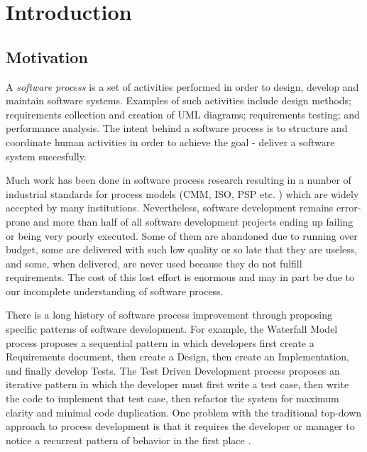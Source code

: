 \chapter{Introduction}
\section{Motivation}
A \textit{software process} is a set of activities performed in order to design, develop and maintain software systems. Examples of such activities include design methods; requirements collection and creation of UML diagrams; requirements testing; and performance analysis. The intent behind a software process is to structure and coordinate human activities in order to achieve the goal - deliver a software system succesfully.

Much work has been done in software process research resulting in a number of industrial standards for process models (CMM, ISO, PSP etc. \cite{citeulike:5043104}) which are widely accepted by many institutions. Nevertheless, software development remains error-prone and more than half of all software development projects ending up failing or being very poorly executed. Some of them are abandoned due to running over budget, some are delivered with such low quality or so late that they are useless, and some, when delivered, are never used because they do not fulfill requirements. The cost of this lost effort is enormous and may in part be due to our incomplete understanding of software process.

There is a long history of software process improvement through proposing specific patterns of software development. For example, the Waterfall Model process proposes a sequential pattern in which developers first create a Requirements document, then create a Design, then create an Implementation, and finally develop Tests. The Test Driven Development process proposes an iterative pattern in which the developer must first write a test case, then write the code to implement that test case, then refactor the system for maximum clarity and minimal code duplication. One problem with the traditional top-down approach to process development is that it requires the developer or manager to notice a recurrent pattern of behavior in the first place \cite{citeulike:5043104}. 

